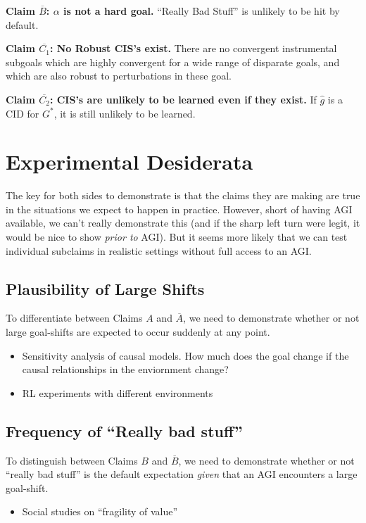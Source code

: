 \documentclass{article}
\begin{document}
\textbf{Claim $\overline{B}$: $\alpha$ is not a hard goal.} “Really Bad Stuff” is unlikely to be hit by default.

\textbf{Claim $\overline{C_1}$: No Robust CIS's exist.} There are no convergent instrumental subgoals which are highly convergent for a wide range of disparate goals, and which are also robust to perturbations in these goal.

\textbf{Claim $\overline{C_2}$: CIS's are unlikely to be learned even if they exist.} If $\hat{g}$ is a CID for $G^*$, it is still unlikely to be learned.

\section{Experimental Desiderata}
The key for both sides to demonstrate is that the claims they are making are true in the situations we expect to happen in practice. However, short of having AGI available, we can’t really demonstrate this (and if the sharp left turn were legit, it would be nice to show \emph{prior to} AGI). But it seems more likely that we can test individual subclaims in realistic settings without full access to an AGI. 

\subsection{Plausibility of Large Shifts}
To differentiate between Claims $A$ and $\overline{A}$, we need to demonstrate whether or not large goal-shifts are expected to occur suddenly at any point. 
\begin{itemize}
    \item Sensitivity analysis of causal models. How much does the goal change if the causal relationships in the enviornment change?
    \item RL experiments with different environments
\end{itemize}

\subsection{Frequency of ``Really bad stuff”}
To distinguish between Claims $B$ and $\overline{B}$, we need to demonstrate whether or not “really bad stuff” is the default expectation \emph{given} that an AGI encounters a large goal-shift.
\begin{itemize}
    \item Social studies on “fragility of value”
\end{itemize}
\end{document}
